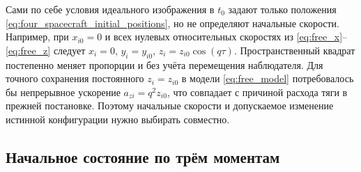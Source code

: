 \documentclass[a4paper,12pt]{article}
\begin{document}
Сами по себе условия идеального изображения в $t_0$ задают только положения \eqref{eq:four_spacecraft_initial_positions}, но не определяют начальные скорости. Например, при $x_{i0}=0$ и всех нулевых относительных скоростях из \eqref{eq:free_x}--\eqref{eq:free_z} следует $x_i=0$, $y_i=y_{i0}$, $z_i=z_{i0}\cos(q\tau)$. Пространственный квадрат постепенно меняет пропорции и без учёта перемещения наблюдателя. Для точного сохранения постоянного $z_i=z_{i0}$ в модели \eqref{eq:free_model} потребовалось бы непрерывное ускорение $a_{zi}=q^2z_{i0}$, что совпадает с причиной расхода тяги в прежней постановке. Поэтому начальные скорости и допускаемое изменение истинной конфигурации нужно выбирать совместно.

\subsection{Начальное состояние по трём моментам}
\end{document}
